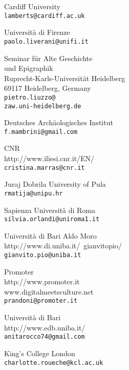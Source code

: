 \begin{contributors}
{   Cardiff University\\
\texttt{lamberts@cardiff.ac.uk}
}


{  Università di Firenze \\
\texttt{paolo.liverani@unifi.it}
}

{Seminar für Alte Geschichte\\ und Epigraphik\\
Ruprecht-Karls-Universität Heidelberg\\
69117 Heidelberg, Germany\\
\texttt{pietro.liuzzo@\\zaw.uni-heidelberg.de}}


{Deutsches Archäologisches Institut \\
\texttt{f.mambrini@gmail.com}
}


{CNR  \\
{ http://www.iliesi.cnr.it/EN/}	\\
\texttt{cristina.marras@cnr.it		}
}
	

{  Juraj Dobrila University of Pula	 \\
\texttt{rmatija@unipu.hr}
}

{  Sapienza Università di Roma	 \\
\texttt{silvia.orlandi@uniroma1.it}
}
	
			

{ Università di Bari Aldo Moro	  \\
{http://www.di.uniba.it/~gianvitopio/ }\\
\texttt{gianvito.pio@uniba.it}
}

{ Promoter	  \\
{http://www.promoter.it} \\
{ www.digitalmeetsculture.net}	\\
\texttt{prandoni@promoter.it}
}



{  Università di Bari	 \\
{http://www.edb.uniba.it/} \\
\texttt{anitarocco74@gmail.com}
}
			

{ King's College London	  \\
\texttt{charlotte.roueche@kcl.ac.uk	}
}
	


\end{contributors}
